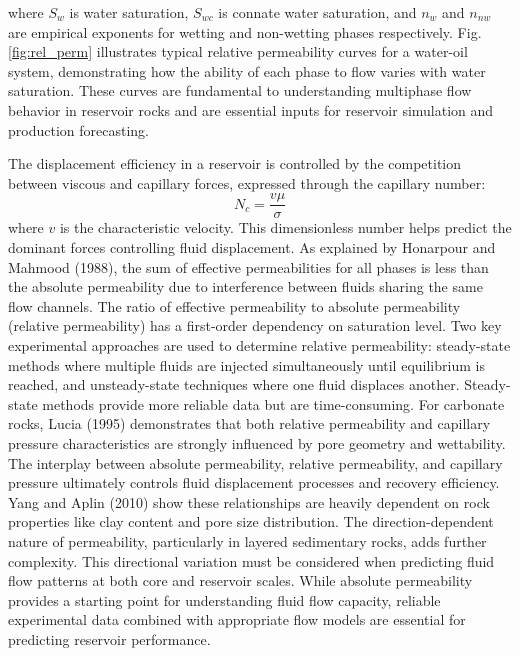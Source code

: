 \documentclass[journal]{IEEEtran}
\begin{document}
where $S_w$ is water saturation, $S_{wc}$ is connate water saturation, and $n_w$ and $n_{nw}$ are empirical exponents for wetting and non-wetting phases respectively. Fig. \ref{fig:rel_perm} illustrates typical relative permeability curves for a water-oil system, demonstrating how the ability of each phase to flow varies with water saturation. These curves are fundamental to understanding multiphase flow behavior in reservoir rocks and are essential inputs for reservoir simulation and production forecasting.

The displacement efficiency in a reservoir is controlled by the competition between viscous and capillary forces, expressed through the capillary number:
\begin{equation}
N_c = \frac{v\mu}{\sigma}
\end{equation}
where $v$ is the characteristic velocity. This dimensionless number helps predict the dominant forces controlling fluid displacement.
As explained by Honarpour and Mahmood (1988)\cite{honarpour_relative-permeability_1988}, the sum of effective permeabilities for all phases is less than the absolute permeability due to interference between fluids sharing the same flow channels. The ratio of effective permeability to absolute permeability (relative permeability) has a first-order dependency on saturation level.
Two key experimental approaches are used to determine relative permeability: steady-state methods where multiple fluids are injected simultaneously until equilibrium is reached, and unsteady-state techniques where one fluid displaces another. Steady-state methods provide more reliable data but are time-consuming.
For carbonate rocks, Lucia (1995)\cite{f_jerry_lucia_2_rock-fabricpetrophysical_1995} demonstrates that both relative permeability and capillary pressure characteristics are strongly influenced by pore geometry and wettability. The interplay between absolute permeability, relative permeability, and capillary pressure ultimately controls fluid displacement processes and recovery efficiency. Yang and Aplin (2010)\cite{yang_permeabilityporosity_2010} show these relationships are heavily dependent on rock properties like clay content and pore size distribution.
The direction-dependent nature of permeability, particularly in layered sedimentary rocks, adds further complexity. This directional variation must be considered when predicting fluid flow patterns at both core and reservoir scales. While absolute permeability provides a starting point for understanding fluid flow capacity, reliable experimental data combined with appropriate flow models are essential for predicting reservoir performance.
\end{document}
